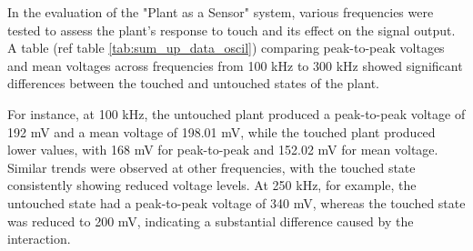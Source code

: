 In the evaluation of the "Plant as a Sensor" system, various frequencies were tested to assess the plant's response to touch and its effect on the signal output. A table (ref table \ref{tab:sum_up_data_oscil}) comparing peak-to-peak voltages and mean voltages across frequencies from 100 kHz to 300 kHz showed significant differences between the touched and untouched states of the plant.

For instance, at 100 kHz, the untouched plant produced a peak-to-peak voltage of 192 mV and a mean voltage of 198.01 mV, while the touched plant produced lower values, with 168 mV for peak-to-peak and 152.02 mV for mean voltage. Similar trends were observed at other frequencies, with the touched state consistently showing reduced voltage levels. At 250 kHz, for example, the untouched state had a peak-to-peak voltage of 340 mV, whereas the touched state was reduced to 200 mV, indicating a substantial difference caused by the interaction.







